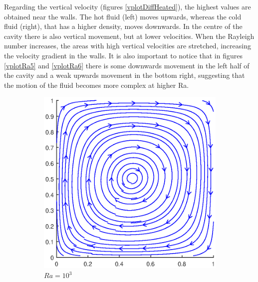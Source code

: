 Regarding the vertical velocity (figures \ref{vplotDiffHeated}), the highest values are obtained near the walls. The hot fluid (left) moves upwards, whereas the cold fluid (right), that has a higher density, moves downwards. In the centre of the cavity there is also vertical movement, but at lower velocities. When the Rayleigh number increases, the areas with high vertical velocities are stretched, increasing the velocity gradient in the walls. It is also important to notice that in figures \ref{vplotRa5} and \ref{vplotRa6} there is some downwards movement in the left half of the cavity and a weak upwards movement in the bottom right, suggesting that the motion of the fluid becomes more complex at higher Ra.

\begin{figure}[h]
	\centering
	\begin{subfigure}{0.5\textwidth}
		\includegraphics[scale=0.61]{Buoyancy/3}
		\caption{$Ra=10^{3}$}
	\end{subfigure}%
	\begin{subfigure}{0.5\textwidth}

\end{subfigure}
\end{figure}
